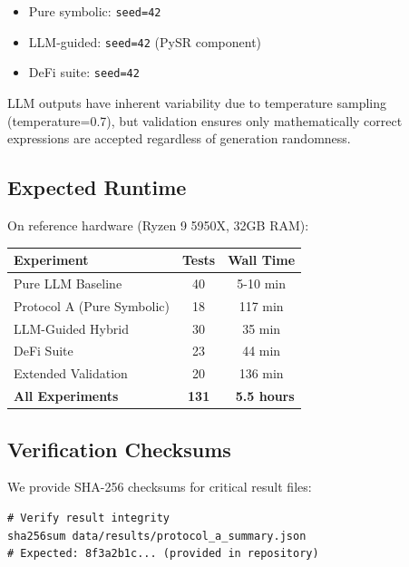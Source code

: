 \documentclass[twoside,11pt]{article}
\begin{document}
\begin{itemize}
\item Pure symbolic: \texttt{seed=42}
\item LLM-guided: \texttt{seed=42} (PySR component)\citep{kambhampati2024llms}
\item DeFi suite: \texttt{seed=42}
\end{itemize}

LLM outputs have inherent variability due to temperature sampling (temperature=0.7), but validation ensures only mathematically correct expressions are accepted regardless of generation randomness\citep{kambhampati2024llms}.

\subsection{Expected Runtime}

On reference hardware (Ryzen 9 5950X, 32GB RAM):

\begin{table}[H]
\centering
\begin{tabular}{@{}lcc@{}}
\toprule
\textbf{Experiment} & \textbf{Tests} & \textbf{Wall Time} \\
\midrule
Pure LLM Baseline & 40 & 5-10 min \\\citep{kambhampati2024llms}
Protocol A (Pure Symbolic) & 18 & 117 min \\
LLM-Guided Hybrid & 30 & 35 min \\\citep{kambhampati2024llms}
DeFi Suite & 23 & 44 min \\
Extended Validation & 20 & 136 min \\
\midrule
\textbf{All Experiments} & \textbf{131} & \textbf{~5.5 hours} \\
\bottomrule
\end{tabular}
\end{table}

\subsection{Verification Checksums}

We provide SHA-256 checksums for critical result files:

\begin{small}
\begin{verbatim}
# Verify result integrity
sha256sum data/results/protocol_a_summary.json
# Expected: 8f3a2b1c... (provided in repository)
\end{verbatim}
\end{small}
\end{document}
